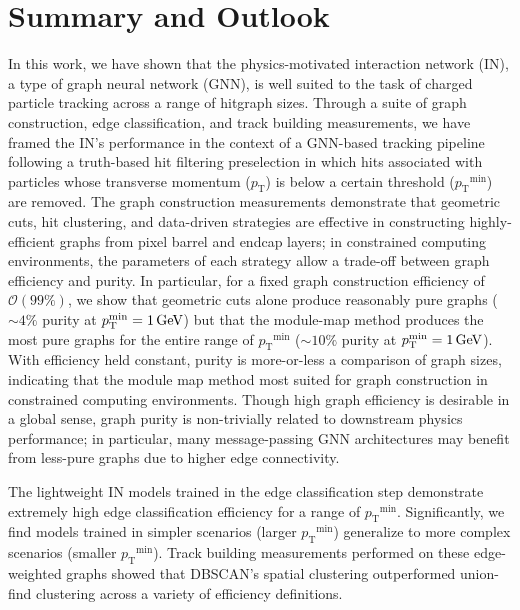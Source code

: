\documentclass[twocolumn]{svjour3}
\newcommand{\pt}{\ensuremath{p_{\mathrm{T}}}\xspace}
\newcommand{\GeV}{\ensuremath{\,\text{Ge\hspace{-.08em}V}}\xspace}
\begin{document}
\section{Summary and Outlook}
\label{sec:summary}
In this work, we have shown that the physics-motivated interaction network (IN), a type of graph neural network (GNN), is well suited to the task of charged particle tracking across a range of hitgraph sizes. 
Through a suite of graph construction, edge classification, and track building measurements, we have framed the IN's performance in the context of a GNN-based tracking pipeline following a truth-based hit filtering preselection in which hits associated with particles whose transverse momentum ($\pt$) is below a certain threshold ($\pt^\mathrm{min}$) are removed. 
The graph construction measurements demonstrate that geometric cuts, hit clustering, and data-driven strategies are effective in constructing highly-efficient graphs from pixel barrel and endcap layers; in constrained computing environments, the parameters of each strategy allow a trade-off between graph efficiency and purity. 
In particular, for a fixed graph construction efficiency of $\mathcal{O}(99\%)$, we show that geometric cuts alone produce reasonably pure graphs ($\sim4\%$ purity at $\pt^\mathrm{min}=1\GeV$) but that the module-map method produces the most pure graphs for the entire range of $\pt^\mathrm{min}$ ($\sim10\%$ purity at $\pt^\mathrm{min}=1\GeV$).
With efficiency held constant, purity is more-or-less a comparison of graph sizes, indicating that the module map method most suited for graph construction in constrained computing environments. 
Though high graph efficiency is desirable in a global sense, graph purity is non-trivially related to downstream physics performance; in particular, many message-passing GNN architectures may benefit from less-pure graphs due to higher edge connectivity.

The lightweight IN models trained in the edge classification step demonstrate extremely high edge classification efficiency for a range of $\pt^\mathrm{min}$.
Significantly, we find models trained in simpler scenarios (larger $\pt^\mathrm{min}$) generalize to more complex scenarios (smaller $\pt^\mathrm{min}$).
Track building measurements performed on these edge-weighted graphs showed that DBSCAN's spatial clustering outperformed union-find clustering across a variety of efficiency definitions.
\end{document}

